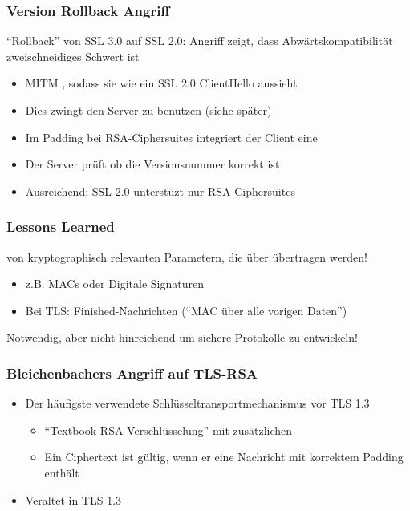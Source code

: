 \subsubsection*{Version Rollback Angriff}
\enquote{Rollback} von SSL 3.0 auf SSL 2.0: Angriff zeigt, dass Abwärtskompatibilität zweischneidiges Schwert ist\\
\begin{itemize}
    \item MITM , sodass sie wie ein SSL 2.0 ClientHello aussieht
    \item Dies zwingt den Server  zu benutzen (siehe später)
\end{itemize}
\begin{itemize}
    \item Im Padding bei RSA-Ciphersuites integriert der Client eine 
    \item Der Server prüft ob die Versionsnummer korrekt ist
    \item Ausreichend: SSL 2.0 unterstüzt nur RSA-Ciphersuites
\end{itemize}
\subsubsection*{Lessons Learned}
 von kryptographisch relevanten Parametern, die über  übertragen werden!
\begin{itemize}
    \item z.B. MACs oder Digitale Signaturen
    \item Bei TLS: Finished-Nachrichten (\enquote{MAC über alle vorigen Daten})
\end{itemize}
\begin{defBox}
    Notwendig, aber nicht hinreichend um sichere Protokolle zu entwickeln!
\end{defBox}
\subsubsection*{Bleichenbachers Angriff auf TLS-RSA}
\begin{itemize}
    \item Der häufigste verwendete Schlüsseltransportmechanismus vor TLS 1.3
    \begin{itemize}
        \item \enquote{Textbook-RSA Verschlüsselung} mit zusätzlichen 
        \item Ein Ciphertext ist gültig, wenn er eine Nachricht mit korrektem Padding enthält
    \end{itemize}
    \item Veraltet in TLS 1.3
\end{itemize}

